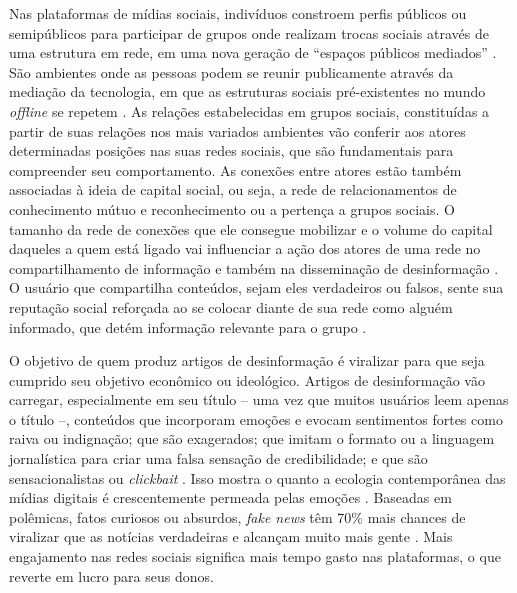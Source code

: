 \documentclass[portuguese]{textolivre}
\begin{document}
Nas plataformas de mídias sociais, indivíduos constroem perfis públicos ou semipúblicos para participar de grupos onde realizam trocas sociais através de uma estrutura em rede, em uma nova geração de “espaços públicos mediados” \cite{boyd_social_2007}. São ambientes onde as pessoas podem se reunir publicamente através da mediação da tecnologia, em que as estruturas sociais pré-existentes no mundo \emph{offline} se repetem \cite{recuero2009redes}. As relações estabelecidas em grupos sociais, constituídas a partir de suas relações nos mais variados ambientes vão conferir aos atores determinadas posições nas suas redes sociais, que são fundamentais para compreender seu comportamento. As conexões entre atores estão também associadas à ideia de capital social, ou seja, a rede de relacionamentos de conhecimento mútuo e reconhecimento ou a pertença a grupos sociais. O tamanho da rede de conexões que ele consegue mobilizar e o volume do capital daqueles a quem está ligado vai influenciar a ação dos atores de uma rede no compartilhamento de informação e também na disseminação de desinformação \cite{bourdieu1986forms, recuero2017introduccao}. O usuário que compartilha conteúdos, sejam eles verdadeiros ou falsos, sente sua reputação social reforçada ao se colocar diante de sua rede como alguém informado, que detém informação relevante para o grupo \cite{baptista_understanding_2020}.

O objetivo de quem produz artigos de desinformação é viralizar para que seja cumprido seu objetivo econômico ou ideológico. Artigos de desinformação vão carregar, especialmente em seu título – uma vez que muitos usuários leem apenas o título –, conteúdos que incorporam emoções e evocam sentimentos fortes como raiva ou indignação; que são exagerados; que imitam o formato ou a linguagem jornalística para criar uma falsa sensação de credibilidade; e que são sensacionalistas ou \emph{clickbait} \cite{baptista_understanding_2020}. Isso mostra o quanto a ecologia contemporânea das mídias digitais é crescentemente permeada pelas emoções \cite{bakir_fake_2018}. Baseadas em polêmicas, fatos curiosos ou absurdos, \emph{fake news} têm 70\% mais chances de viralizar que as notícias verdadeiras e alcançam muito mais gente \cite{vosoughi_spread_2018}. Mais engajamento nas redes sociais significa mais tempo gasto nas plataformas, o que reverte em lucro para seus donos.
\end{document}
